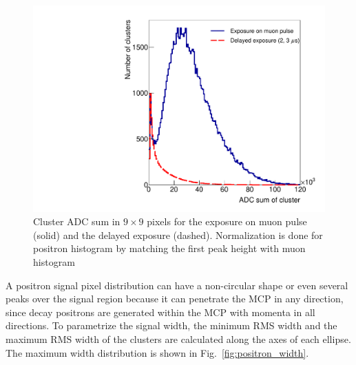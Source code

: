 \documentclass[preprint,3p,twocolumn]{elsarticle}
\begin{document}
\begin{figure}[tbp]
	\centering
	\includegraphics[width=\columnwidth]{figure/Integ_legend_v2.pdf}
	\caption{Cluster ADC sum in $9\times9$ pixels for the
          exposure on muon pulse (solid) and the delayed exposure
          (dashed).  Normalization is done for positron histogram
          by matching the first peak height with muon histogram}
	\vspace{-0.2cm}
	\label{fig:BPM_int}
\end{figure}
%

A positron signal pixel distribution can have a non-circular shape or even several
peaks over the signal region because it can penetrate the MCP in
any direction, since decay positrons are generated within the MCP
with momenta in all directions.  
To parametrize the signal
width, the minimum RMS width and the maximum RMS width of the
clusters are calculated along the axes of each ellipse. The
maximum width distribution is shown in
Fig.~\ref{fig:positron_width}.
\end{document}
